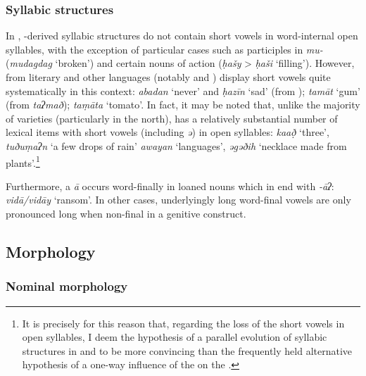 \documentclass[output=paper]{langsci/langscibook}
\begin{document}
\subsubsection{Syllabic structures} %

In , -derived syllabic structures do not contain short vowels in word-internal open syllables, with the exception of particular cases such as  participles in \textit{mu-} (\textit{mudagdag} ‘broken’) and certain nouns of action (\textit{ḥašy} > \textit{ḥaši} ‘filling’). However,  from literary  and other languages (notably  and ) display short vowels quite systematically in this context: \textit{abadan} ‘never’ and \textit{ḥazīn} ‘sad’ (from  ); \textit{tamāt} ‘gum’ (from  \textit{taʔmað}); \textit{taṃāta} ‘tomato’. In fact, it may be noted that, unlike the majority of  varieties (particularly in the north),  has a relatively substantial number of lexical items with short vowels (including \textit{ə}) in open syllables: \textit{ka{\R}að̣} ‘three’, \textit{tuðu}\textit{ṃaʔn} ‘a few drops of rain’ \textit{awayan} ‘languages’, \textit{əgəðih} ‘necklace made from plants'.\footnote{It is precisely for this reason that, regarding the loss of the short vowels in open syllables, I deem the hypothesis of a parallel evolution of syllabic structures in   and  to be more convincing than the frequently held alternative hypothesis of a one-way influence of the   on the  .} 

Furthermore, a  \textit{ā} occurs word-finally in loaned nouns which in   end with \textit{{}-āʔ}: \textit{vidā/vidāy} ‘ransom’. In other cases, underlyingly long word-final vowels are only pronounced long when non-final in a genitive construct.

\subsection{Morphology} %

\subsubsection{Nominal morphology} %

\end{document}
